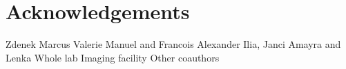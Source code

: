 \chapter*{Acknowledgements}
Zdenek
Marcus
Valerie
Manuel and Francois
Alexander
Ilia, Janci
Amayra and Lenka
Whole lab
Imaging facility
Other coauthors
